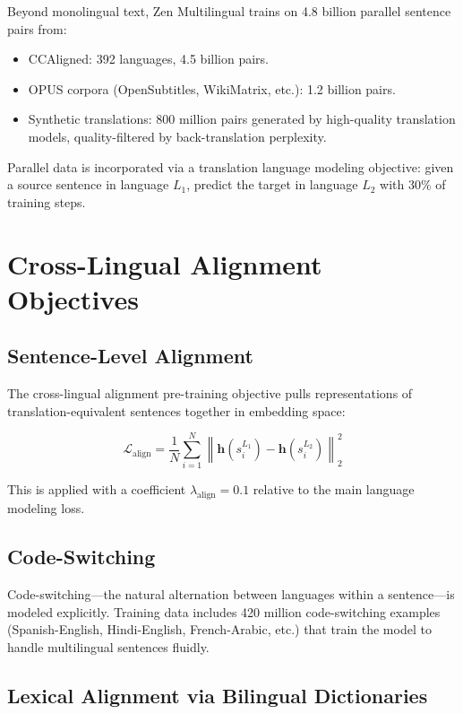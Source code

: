 \documentclass[11pt,a4paper]{article}
\begin{document}
Beyond monolingual text, Zen Multilingual trains on 4.8 billion parallel sentence pairs from:

\begin{itemize}
  \item CCAligned: 392 languages, 4.5 billion pairs.
  \item OPUS corpora (OpenSubtitles, WikiMatrix, etc.): 1.2 billion pairs.
  \item Synthetic translations: 800 million pairs generated by high-quality translation models, quality-filtered by back-translation perplexity.
\end{itemize}

Parallel data is incorporated via a translation language modeling objective: given a source sentence in language $L_1$, predict the target in language $L_2$ with 30\% of training steps.

\section{Cross-Lingual Alignment Objectives}

\subsection{Sentence-Level Alignment}

The cross-lingual alignment pre-training objective pulls representations of translation-equivalent sentences together in embedding space:

\begin{equation}
\mathcal{L}_{\text{align}} = \frac{1}{N} \sum_{i=1}^N \left\|\mathbf{h}(s_i^{L_1}) - \mathbf{h}(s_i^{L_2})\right\|_2^2
\end{equation}

This is applied with a coefficient $\lambda_{\text{align}} = 0.1$ relative to the main language modeling loss.

\subsection{Code-Switching}

Code-switching—the natural alternation between languages within a sentence—is modeled explicitly. Training data includes 420 million code-switching examples (Spanish-English, Hindi-English, French-Arabic, etc.) that train the model to handle multilingual sentences fluidly.

\subsection{Lexical Alignment via Bilingual Dictionaries}
\end{document}
